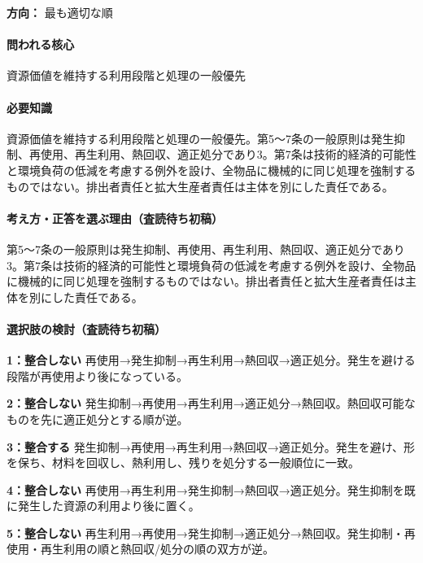 \noindent\textbf{方向：} 最も適切な順\par

\paragraph{問われる核心} 資源価値を維持する利用段階と処理の一般優先

\paragraph{必要知識} 資源価値を維持する利用段階と処理の一般優先。第5〜7条の一般原則は発生抑制、再使用、再生利用、熱回収、適正処分であり3。第7条は技術的経済的可能性と環境負荷の低減を考慮する例外を設け、全物品に機械的に同じ処理を強制するものではない。排出者責任と拡大生産者責任は主体を別にした責任である。

\paragraph{考え方・正答を選ぶ理由（査読待ち初稿）} 第5〜7条の一般原則は発生抑制、再使用、再生利用、熱回収、適正処分であり3。第7条は技術的経済的可能性と環境負荷の低減を考慮する例外を設け、全物品に機械的に同じ処理を強制するものではない。排出者責任と拡大生産者責任は主体を別にした責任である。

\paragraph{選択肢の検討（査読待ち初稿）}\mbox{}\par

\noindent\textbf{1：整合しない} 再使用→発生抑制→再生利用→熱回収→適正処分。発生を避ける段階が再使用より後になっている。\par

\noindent\textbf{2：整合しない} 発生抑制→再使用→再生利用→適正処分→熱回収。熱回収可能なものを先に適正処分とする順が逆。\par

\noindent\textbf{3：整合する} 発生抑制→再使用→再生利用→熱回収→適正処分。発生を避け、形を保ち、材料を回収し、熱利用し、残りを処分する一般順位に一致。\par

\noindent\textbf{4：整合しない} 再使用→再生利用→発生抑制→熱回収→適正処分。発生抑制を既に発生した資源の利用より後に置く。\par

\noindent\textbf{5：整合しない} 再生利用→再使用→発生抑制→適正処分→熱回収。発生抑制・再使用・再生利用の順と熱回収/処分の順の双方が逆。\par

